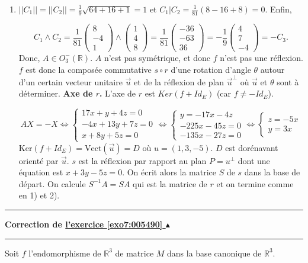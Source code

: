 \documentclass[11pt,a4paper]{article}
\newcommand{\Rr}{\mathbb{R}} \newcommand{\R}{\mathbb{R}}
\newcounter{exo}
\newcommand{\correction}[1]{\hypertarget{cor7:#1}{}\label{cor7:#1}{\bf Correction de \hyperlink{exo7:#1}{l'exercice \ref{exo7:#1} $\blacktriangle$}}\vspace{1mm}\hrule\vspace{1mm}}
\newcommand{\fincorrection}{\vspace{1mm}\hrule\vspace*{7mm}}
\begin{document}
\begin{enumerate}
\begin{center}
\end{center}
 \item  $||C_1||=||C_2||=\frac{1}{9}\sqrt{64+16+1}=1$ et $C_1|C_2=\frac{1}{81}(8-16+8)=0$. Enfin,

$$C_1\wedge C_2=\frac{1}{81}\left(
\begin{array}{c}
8\\
-4\\
1
\end{array}
\right)\wedge\left(
\begin{array}{c}
1\\
4\\
8
\end{array}
\right)=\frac{1}{81}\left(
\begin{array}{c}
-36\\
-63\\
36
\end{array}
\right)=-\frac{1}{9}\left(
\begin{array}{c}
4\\
7\\
-4
\end{array}
\right)=-C_3.$$
Donc, $A\in O_3^-(\Rr)$. $A$ n'est pas symétrique, et donc $f$ n'est pas une réflexion. $f$ est donc la composée commutative $s\circ r$ d'une rotation d'angle $\theta$ autour d'un certain vecteur unitaire $\overrightarrow{u}$ et de la réflexion de plan $\overrightarrow{u}^\bot$ où $\overrightarrow{u}$ et $\theta$ sont à déterminer.
\textbf{Axe de $r$.} L'axe de $r$ est $Ker(f+Id_E)$ (car $f\neq-Id_E$).

$$AX=-X\Leftrightarrow\left\{
\begin{array}{l}
17x+y+4z=0\\
-4x+13y+7z=0\\
x+8y+5z=0
\end{array}
\right.\Leftrightarrow\left\{
\begin{array}{l}
y=-17x-4z\\
-225x-45z=0\\
-135x-27z=0
\end{array}
\right.\Leftrightarrow\left\{
\begin{array}{l}
z=-5x\\
y=3x
\end{array}\right.$$
$\mbox{Ker}(f+Id_E)=\mbox{Vect}(\overrightarrow{u})=D$ où $u=(1,3,-5)$. $D$ est dorénavant orienté par $\overrightarrow{u}$.
$s$ est la réflexion par rapport au plan $P=u^\bot$ dont une équation est $x+3y-5z=0$.
On écrit alors la matrice $S$ de $s$ dans la base de départ. On calcule $S^{-1}A=SA$ qui est la matrice de $r$ et on termine comme en 1) et 2).
\end{enumerate}
\fincorrection
\correction{005490}
Soit $f$ l'endomorphisme de $\Rr^3$ de matrice $M$ dans la base canonique de $\Rr^3$.
\end{document}
